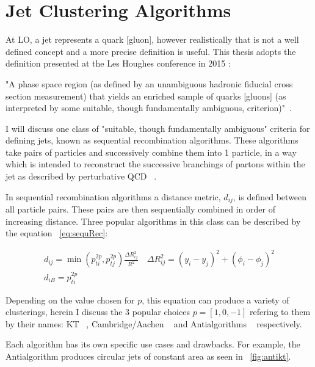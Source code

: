 \section{Jet Clustering Algorithms}\label{secSM:ch1}

At LO, a jet represents a quark [gluon], however realistically that is not a well defined concept and a more precise definition is useful. This thesis adopts the definition presented at the Les Houghes conference in 2015 :\newline

"A phase space region (as defined by an unambiguous hadronic fiducial cross section measurement) that yields an enriched sample of quarks [gluons] (as interpreted by some suitable, though fundamentally ambiguous, criterion)"~\cite{Badger:2016bpw}.\newline 

I will discuss one class of "suitable, though fundamentally ambiguous" criteria for defining jets, known as sequential recombination algorithms. These algorithms take pairs of particles and successively combine them into 1 particle, in a way which is intended to reconstruct the successive branchings of partons within the jet as described by perturbative QCD ~\cite{Marzani:2019hun}.
 
In sequential recombination algorithms a distance metric, $d_{ij}$, is defined between all particle pairs. These pairs are then sequentially combined in order of increasing distance. Three popular algorithms in this class can be described by the equation ~\ref{eq:sequRec}:


\begin{equation}
\begin{array}{l}{d_{i j}=\min \left(p_{t i}^{2 p}, p_{t j}^{2 p}\right) \frac{\Delta R_{i j}^{2}}{R^{2}} \quad \Delta R_{i j}^{2}=\left(y_{i}-y_{j}\right)^{2}+\left(\phi_{i}-\phi_{j}\right)^{2}} \\ {d_{i B}=p_{t i}^{2 p}}\end{array}
\end{equation}\label{eq:sequRec}


Depending on the value chosen for $p$, this equation can produce a variety of clusterings, herein I discuss the 3 popular choices $p = [1, 0, -1]$ refering to them by their names: KT ~\cite{Ellis:1993tq}, Cambridge/Aachen ~\cite{Dokshitzer:1997in} and Anti\kt algorithms ~\cite{Cacciari:2008gp} respectively.

Each algorithm has its own specific use cases and drawbacks. For example, the Anti\kt algorithm produces circular jets of constant area as seen in ~\ref{fig:antikt}. 

